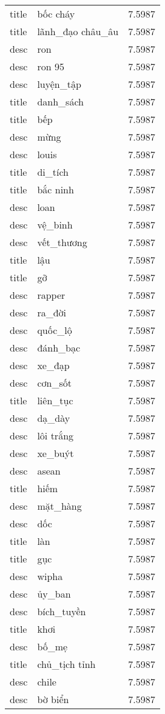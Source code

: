 \documentclass{article}
\begin{document}
\begin{tabular}{lll}
title & bốc cháy & 7.5987\\
title & lãnh\_đạo châu\_âu & 7.5987\\
desc & ron & 7.5987\\
desc & ron 95 & 7.5987\\
desc & luyện\_tập & 7.5987\\
title & danh\_sách & 7.5987\\
title & bếp & 7.5987\\
desc & mừng & 7.5987\\
desc & louis & 7.5987\\
title & di\_tích & 7.5987\\
title & bắc ninh & 7.5987\\
desc & loan & 7.5987\\
desc & vệ\_binh & 7.5987\\
desc & vết\_thương & 7.5987\\
title & lậu & 7.5987\\
title & gỡ & 7.5987\\
desc & rapper & 7.5987\\
desc & ra\_đời & 7.5987\\
desc & quốc\_lộ & 7.5987\\
desc & đánh\_bạc & 7.5987\\
desc & xe\_đạp & 7.5987\\
desc & cơn\_sốt & 7.5987\\
title & liên\_tục & 7.5987\\
desc & dạ\_dày & 7.5987\\
desc & lôi trắng & 7.5987\\
desc & xe\_buýt & 7.5987\\
desc & asean & 7.5987\\
title & hiếm & 7.5987\\
desc & mặt\_hàng & 7.5987\\
desc & dốc & 7.5987\\
title & làn & 7.5987\\
title & gục & 7.5987\\
desc & wipha & 7.5987\\
desc & ủy\_ban & 7.5987\\
desc & bích\_tuyền & 7.5987\\
title & khơi & 7.5987\\
desc & bố\_mẹ & 7.5987\\
title & chủ\_tịch tỉnh & 7.5987\\
desc & chile & 7.5987\\
desc & bờ biển & 7.5987\\

\end{tabular}
\end{document}
